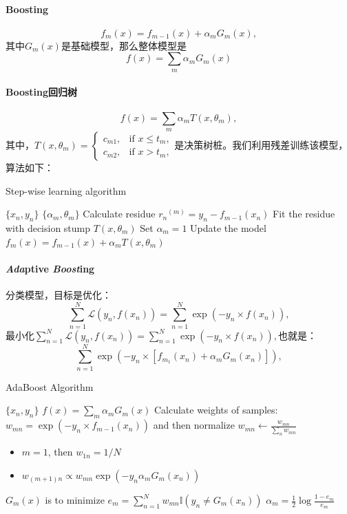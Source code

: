 \paragraph{Boosting}
$$f_m(x) = f_{m-1}(x) + \alpha_mG_m(x),$$
其中$G_m(x)$是基础模型，那么整体模型是
$$f(x) = \sum_m \alpha_m G_m(x)$$

\paragraph{Boosting回归树}
$$f(x) = \sum_m \alpha_m T(x, \theta_m),$$
其中，$T(x,\theta_m)=\left\{\begin{array}{ll}
    c_{m1}, & \text{if }x \le t_m, \\
    c_{m2}, & \text{if }x > t_m,
\end{array} \right.$是决策树桩。我们利用残差训练该模型，算法如下：
\begin{algorithm}[H]
\caption{Step-wise learning algorithm}
\label{alg:step-wise}
\begin{algorithmic}[1]
\Require $\{x_n, y_n\}$
\Ensure $\{\alpha_m, \theta_m\}$
\State Calculate residue ${r_n}^{(m)} = y_n - f_{m-1}(x_n)$
\State Fit the residue with decision stump $T(x,\theta_m)$
\State Set $\alpha_m = 1$
\State Update the model $f_m(x) = f_{m-1}(x) + \alpha_mT(x, \theta_m)$
\EndFor
\end{algorithmic}
\end{algorithm}

\paragraph{\textit{Ada}ptive \textit{Boost}ing}
分类模型，目标是优化：
$$\sum_{n=1}^N \mathcal{L}(y_n, f(x_n)) = \sum_{n=1}^N \exp(-y_n \times f(x_n)),$$
最小化$\sum^N_{n=1} \mathcal{L}(y_n, f(x_n)) = \sum_{n=1}^N \exp(-y_n \times f(x_n)),$也就是：
$$
\sum_{n=1}^N \exp(-y_n \times [f_{m_1}(x_n) + \alpha_mG_m(x_n)]),
$$

\begin{algorithm}[H]
\caption{AdaBoost Algorithm}
\label{alg:AdaBoost}
\begin{algorithmic}[1]
\Require $\{x_n, y_n\}$
\Ensure $f(x) = \sum_m \alpha_mG_m(x)$
\State Calculate weights of samples: $w_{mn} = \exp(-y_n \times f_{m-1}(x_n))$ and then
normalize $w_{mn} \leftarrow \frac{w_{mn}}{\sum_n w_{mn}}$\begin{itemize}
    \item $m=1$, then $w_{1n} = 1/N$
    \item $w_{(m+1)n} \propto w_{mn}\exp(-y_n\alpha_mG_m(x_n))$
\end{itemize}
\State $G_m(x)$ is to minimize $e_m = \sum_{n=1}^N w_{mn}\mathbb{I}(y_n \neq G_m(x_n))$
\State $\alpha_m = \frac{1}{2} \log \frac{1-e_m}{e_m}$
\EndFor
\end{algorithmic}
\end{algorithm}

